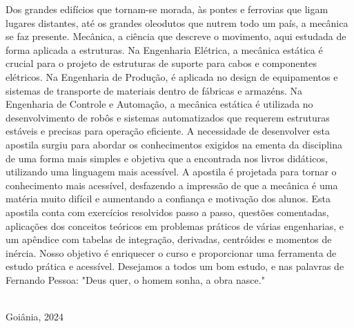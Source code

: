 \documentclass[a4paper, 14pt, twoside]{article}
\begin{document}
    Dos grandes edifícios que tornam-se morada, às pontes e ferrovias que ligam lugares distantes, até os grandes oleodutos que nutrem todo um país, a mecânica se faz presente. Mecânica, a ciência que descreve o movimento, aqui estudada de forma aplicada a estruturas. Na Engenharia Elétrica, a mecânica estática é crucial para o projeto de estruturas de suporte para cabos e componentes elétricos. Na Engenharia de Produção, é aplicada no design de equipamentos e sistemas de transporte de materiais dentro de fábricas e armazéns. Na Engenharia de Controle e Automação, a mecânica estática é utilizada no desenvolvimento de robôs e sistemas automatizados que requerem estruturas estáveis e precisas para operação eficiente.
    A necessidade de desenvolver esta apostila surgiu para abordar os conhecimentos exigidos na ementa da disciplina de uma forma mais simples e objetiva que a encontrada nos livros didáticos, utilizando uma linguagem mais acessível. A apostila é projetada para tornar o conhecimento mais acessível, desfazendo a impressão de que a mecânica é uma matéria muito difícil e aumentando a confiança e motivação dos alunos.
    Esta apostila conta com exercícios resolvidos passo a passo, questões comentadas, aplicações dos conceitos teóricos em problemas práticos de várias engenharias, e um apêndice com tabelas de integração, derivadas, centróides e momentos de inércia.
    Nosso objetivo é enriquecer o curso e proporcionar uma ferramenta de estudo prática e acessível. Desejamos a todos um bom estudo, e nas palavras de Fernando Pessoa:
    \large "Deus quer, o homem sonha, a obra nasce."\\
    \vspace{2cm}\\
        \begin{center}
            {\large Goiânia, 2024}
        \end{center}
  
\newpage

\thispagestyle{empty}
\end{document}
